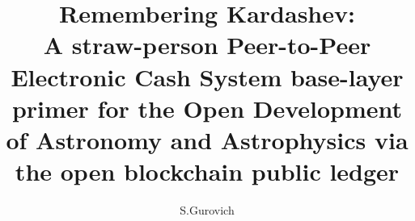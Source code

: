\documentclass[final,5p,times,twocolumn,authoryear]{elsarticle}
\begin{document}
\begin{frontmatter}

\title{ Remembering Kardashev:\\ A straw-person Peer-to-Peer Electronic Cash System base-layer primer for the Open Development of Astronomy and Astrophysics via the open blockchain public ledger}
 
    \author[iate,wsu]{S.Gurovich}
  
\address[iate]{
   Instituto De Astronom\'ia Te\'orica y Experimental -
   Observatorio Astron\'omico C\'ordoba (IATE--OAC--UNC--CONICET),
   Laprida 854, X5000BGR, C\'ordoba, Argentina}
\address[wsu]{
   Western Sydney University, Kingswood campus, NSW, Australia
}

\begin{abstract}


\end{abstract}
\end{frontmatter}
\end{document}

